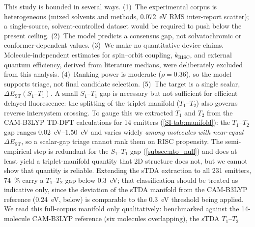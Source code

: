 This study is bounded in several ways.
(1)~The experimental corpus is heterogeneous (mixed solvents and methods,
\qty{0.072}{\electronvolt} RMS inter-report scatter); a single-source,
solvent-controlled dataset would be required to push below the present ceiling.
(2)~The model predicts a consensus gap, not solvatochromic or
conformer-dependent values.
(3)~We make no quantitative device claims.
Molecule-independent estimates for spin–orbit coupling, $k_\text{RISC}$, and external quantum efficiency, derived from literature medians, were deliberately 
excluded from this analysis.
(4)~Ranking power is moderate ($\rho = 0.36$), so the model supports triage, not
final candidate selection.
(5)~The target is a single scalar, $\Delta E_\text{ST}(S_1\text{--}T_1)$. A small
$S_1$--$T_1$ gap is necessary but not sufficient for efficient delayed fluorescence:
the splitting of the triplet manifold ($T_1$--$T_2$) also governs reverse intersystem
crossing.\cite{Keruckiene2024} To gauge this we extracted $T_1$ and $T_2$ from the
CAM-B3LYP TD-DFT calculations for \num{14} emitters (\cref{SI-tab:manifold}): the
$T_1$--$T_2$ gap ranges \qtyrange{0.02}{1.50}{\electronvolt} and varies widely
\emph{among molecules with near-equal $\Delta E_\text{ST}$}, so a scalar-gap triage
cannot rank them on RISC propensity. The semi-empirical step is redundant for the
$S_1$--$T_1$ gap (\cref{subsec:nto_null}) and does at least yield a triplet-manifold
quantity that 2D structure does not, but we cannot show that quantity is reliable.
Extending the sTDA extraction to all \num{231} emitters, \qty{74}{\percent} carry a
$T_1$--$T_2$ gap below \qty{0.3}{\electronvolt}; that classification should be treated
as indicative only, since the deviation of the sTDA manifold from the CAM-B3LYP reference
(\qty{0.24}{\electronvolt}, below) is comparable to the \qty{0.3}{\electronvolt}
threshold being applied.
We read this full-corpus manifold only qualitatively: benchmarked against the
\num{14}-molecule CAM-B3LYP reference (six molecules overlapping), the sTDA $T_1$--$T_2$

